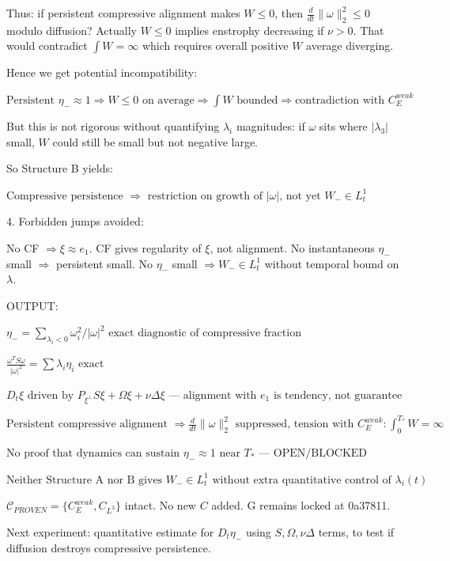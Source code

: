 \documentclass[11pt]{article}
\begin{document}
Thus: if persistent compressive alignment makes $W\le0$, then $\frac{d}{dt}\|\omega\|_2^2\le0$ modulo diffusion? Actually $W\le0$ implies enstrophy decreasing if $\nu>0$. That would contradict $\int W =\infty$ which requires overall positive $W$ average diverging.

Hence we get potential incompatibility:

$\boxed{\text{Persistent }\eta_-\approx1 \Rightarrow W\le0\text{ on average}\Rightarrow \int W\text{ bounded}\Rightarrow\text{contradiction with }C_E^{weak}}$

But this is not rigorous without quantifying $\lambda_i$ magnitudes: if $\omega$ sits where $|\lambda_3|$ small, $W$ could still be small but not negative large.

So Structure B yields:

$\boxed{\text{Compressive persistence }\Rightarrow\text{ restriction on growth of }|\omega|\text{, not yet }W_-\in L^1_t}$

4. Forbidden jumps avoided:

No CF $\Rightarrow\xi\approx e_1$. CF gives regularity of $\xi$, not alignment.
No instantaneous $\eta_-$ small $\Rightarrow$ persistent small.
No $\eta_-$ small $\Rightarrow W_-\in L^1_t$ without temporal bound on $\lambda$.

OUTPUT:

$\boxed{\eta_-=\sum_{\lambda_i<0}\omega_i^2/|\omega|^2\text{ exact diagnostic of compressive fraction}}$

$\boxed{\frac{\omega^T S\omega}{|\omega|^2}=\sum\lambda_i\eta_i\text{ exact}}$

$\boxed{D_t\xi\text{ driven by }P_{\xi^\perp}S\xi+\Omega\xi+\nu\Delta\xi\text{ — alignment with }e_1\text{ is tendency, not guarantee}}$

$\boxed{\text{Persistent compressive alignment }\Rightarrow\frac{d}{dt}\|\omega\|_2^2\text{ suppressed, tension with }C_E^{weak}:\int_0^{T_*}W=\infty}$

$\boxed{\text{No proof that dynamics can sustain }\eta_-\approx1\text{ near }T_*\text{ — OPEN/BLOCKED}}$

$\boxed{\text{Neither Structure A nor B gives }W_-\in L^1_t\text{ without extra quantitative control of }\lambda_i(t)}$

$\mathcal{C}_{PROVEN}=\{C_E^{weak},C_{L^3}\}$ intact. No new $C$ added. G remains locked at 0a37811.

Next experiment: quantitative estimate for $D_t\eta_-$ using $S,\Omega,\nu\Delta$ terms, to test if diffusion destroys compressive persistence.
\end{document}
